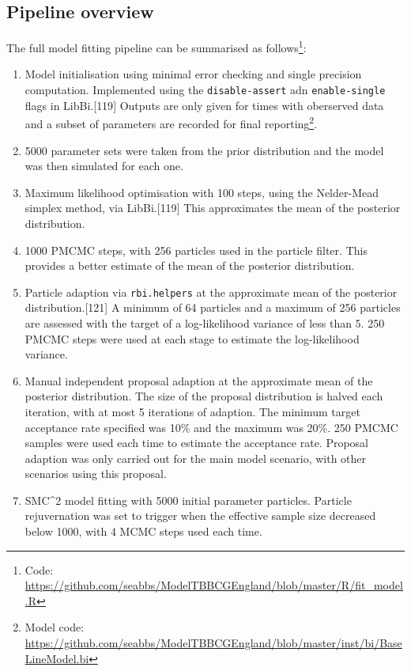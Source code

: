 \documentclass[11pt,twoside]{bristolthesis}
\begin{document}
  \hypertarget{pipeline-overview}{%
  \subsection{Pipeline overview}\label{pipeline-overview}}
  
  The full model fitting pipeline can be summarised as follows\footnote{Code: \url{https://github.com/seabbs/ModelTBBCGEngland/blob/master/R/fit_model.R}}:
  \begin{enumerate}
  \def\labelenumi{\arabic{enumi}.}
  \item
    Model initialisation using minimal error checking and single precision computation. Implemented using the \texttt{disable-assert} adn \texttt{enable-single} flags in LibBi.{[}119{]} Outputs are only given for times with oberserved data and a subset of parameters are recorded for final reporting\footnote{Model code: \url{https://github.com/seabbs/ModelTBBCGEngland/blob/master/inst/bi/BaseLineModel.bi}}.
  \item
    5000 parameter sets were taken from the prior distribution and the model was then simulated for each one.
  \item
    Maximum likelihood optimisation with 100 steps, using the Nelder-Mead simplex method, via LibBi.{[}119{]} This approximates the mean of the posterior distribution.
  \item
    1000 PMCMC steps, with 256 particles used in the particle filter. This provides a better estimate of the mean of the posterior distribution.
  \item
    Particle adaption via \texttt{rbi.helpers} at the approximate mean of the posterior distribution.{[}121{]} A minimum of 64 particles and a maximum of 256 particles are assessed with the target of a log-likelihood variance of less than 5. 250 PMCMC steps were used at each stage to estimate the log-likelihood variance.
  \item
    Manual independent proposal adaption at the approximate mean of the posterior distribution. The size of the proposal distribution is halved each iteration, with at most 5 iterations of adaption. The minimum target acceptance rate specified was 10\% and the maximum was 20\%. 250 PMCMC samples were used each time to estimate the acceptance rate. Proposal adaption was only carried out for the main model scenario, with other scenarios using this proposal.
  \item
    SMC\^{}2 model fitting with 5000 initial parameter particles. Particle rejuvernation was set to trigger when the effective sample size decreased below 1000, with 4 MCMC steps used each time.

\end{enumerate}
\end{document}
